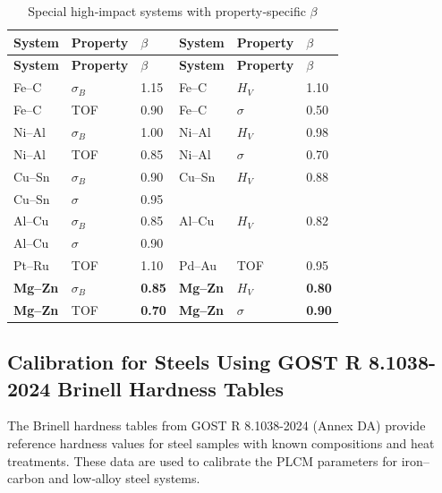 \documentclass[12pt,a4paper]{article}
\begin{document}
	\begin{longtable}{p{2.2cm} p{2.2cm} p{1.2cm} p{2.2cm} p{2.2cm} p{1.2cm}}
		\caption{Special high‑impact systems with property‑specific $\beta$}\label{tab:beta_special}\\
		\toprule
		\textbf{System} & \textbf{Property} & $\beta$ & \textbf{System} & \textbf{Property} & $\beta$ \\
		\midrule
		\endfirsthead
		\toprule
		\textbf{System} & \textbf{Property} & $\beta$ & \textbf{System} & \textbf{Property} & $\beta$ \\
		\midrule
		\endhead
		Fe–C  & $\sigma_B$ & 1.15 & Fe–C  & $H_V$ & 1.10 \\
		Fe–C  & TOF & 0.90 & Fe–C  & $\sigma$ & 0.50 \\
		Ni–Al & $\sigma_B$ & 1.00 & Ni–Al & $H_V$ & 0.98 \\
		Ni–Al & TOF & 0.85 & Ni–Al & $\sigma$ & 0.70 \\
		Cu–Sn & $\sigma_B$ & 0.90 & Cu–Sn & $H_V$ & 0.88 \\
		Cu–Sn & $\sigma$ & 0.95 & & & \\
		Al–Cu & $\sigma_B$ & 0.85 & Al–Cu & $H_V$ & 0.82 \\
		Al–Cu & $\sigma$ & 0.90 & & & \\
		Pt–Ru & TOF & 1.10 & Pd–Au & TOF & 0.95 \\
		\rowcolor{gray!10}
		\textbf{Mg–Zn} & $\sigma_B$ & \textbf{0.85} & \textbf{Mg–Zn} & $H_V$ & \textbf{0.80} \\
		\textbf{Mg–Zn} & TOF & \textbf{0.70} & \textbf{Mg–Zn} & $\sigma$ & \textbf{0.90} \\
		\bottomrule
	\end{longtable}
	
	
	\subsection{Calibration for Steels Using GOST R 8.1038-2024 Brinell Hardness Tables}
	\label{subsec:steel_calibration}
	
	The Brinell hardness tables from GOST R 8.1038-2024 (Annex DA) provide reference hardness values for steel samples with known compositions and heat treatments. These data are used to calibrate the PLCM parameters for iron–carbon and low‑alloy steel systems.
	
\end{document}
